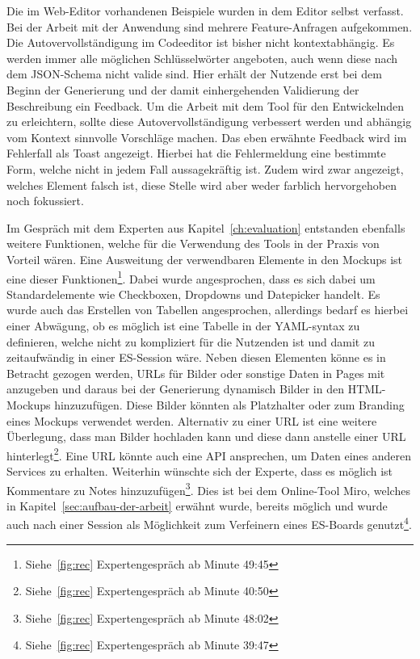Die im Web-Editor vorhandenen Beispiele wurden in dem Editor selbst verfasst.
Bei der Arbeit mit der Anwendung sind mehrere Feature-Anfragen aufgekommen.
Die Autovervollständigung im Codeeditor ist bisher nicht kontextabhängig.
Es werden immer alle möglichen Schlüsselwörter angeboten, auch wenn diese nach dem JSON-Schema nicht valide sind.
Hier erhält der Nutzende erst bei dem Beginn der Generierung und der damit einhergehenden Validierung der Beschreibung ein Feedback.
Um die Arbeit mit dem Tool für den Entwickelnden zu erleichtern, sollte diese Autovervollständigung verbessert werden und abhängig vom Kontext
sinnvolle Vorschläge machen.
Das eben erwähnte Feedback wird im Fehlerfall als Toast angezeigt.
Hierbei hat die Fehlermeldung eine bestimmte Form, welche nicht in jedem Fall aussagekräftig ist.
Zudem wird zwar angezeigt, welches Element falsch ist, diese Stelle wird aber weder farblich hervorgehoben noch fokussiert.

Im Gespräch mit dem Experten aus Kapitel~\ref{ch:evaluation} entstanden ebenfalls weitere Funktionen, welche für die Verwendung des Tools in der Praxis von Vorteil wären.
Eine Ausweitung der verwendbaren Elemente in den Mockups ist eine dieser Funktionen\footnote{Siehe~\ref{fig:rec} Expertengespräch ab Minute  49:45}.
Dabei wurde angesprochen, dass es sich dabei um Standardelemente wie Checkboxen, Dropdowns und Datepicker handelt.
Es wurde auch das Erstellen von Tabellen angesprochen, allerdings bedarf es hierbei einer Abwägung, ob es möglich ist eine Tabelle in der YAML-syntax zu definieren,
welche nicht zu kompliziert für die Nutzenden ist und damit zu zeitaufwändig in einer \ac{ES}-Session wäre.
Neben diesen Elementen könne es in Betracht gezogen werden, URLs für Bilder oder sonstige Daten in Pages mit anzugeben und
daraus bei der Generierung dynamisch Bilder in den HTML-Mockups hinzuzufügen.
Diese Bilder könnten als Platzhalter oder zum Branding eines Mockups verwendet werden.
Alternativ zu einer URL ist eine weitere Überlegung, dass man Bilder hochladen kann und diese dann anstelle einer URL hinterlegt\footnote{Siehe~\ref{fig:rec} Expertengespräch ab Minute  40:50}.
Eine URL könnte auch eine API ansprechen, um Daten eines anderen Services zu erhalten.
Weiterhin wünschte sich der Experte, dass es möglich ist Kommentare zu Notes hinzuzufügen\footnote{Siehe~\ref{fig:rec} Expertengespräch ab Minute  48:02}.
Dies ist bei dem Online-Tool Miro, welches in Kapitel~\ref{sec:aufbau-der-arbeit} erwähnt wurde, bereits möglich und wurde auch nach einer Session als Möglichkeit
zum Verfeinern eines \ac{ES}-Boards genutzt\footnote{Siehe~\ref{fig:rec} Expertengespräch ab Minute  39:47}.

